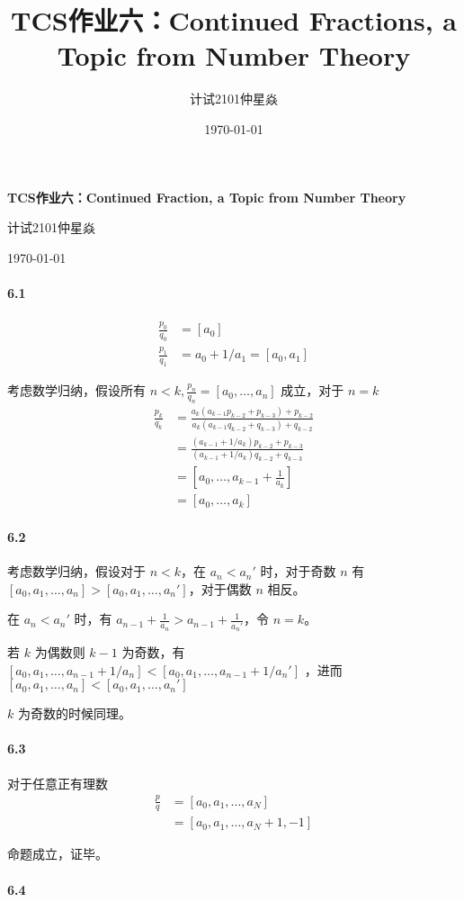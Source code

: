 \documentclass[12pt, a4paper, oneside]{ctexart}
\title{\textbf{TCS作业六：Continued Fractions, a Topic from Number Theory}}
\author{计试2101仲星焱}
\date{\today}
\begin{document}
	\textbf{TCS作业六：Continued Fraction, a Topic from Number Theory}
	
	计试2101仲星焱
	
	\today
	
	\paragraph{6.1}
	$$
	\begin{aligned}
		\frac{p_0}{q_0}&=[a_0]\\
		\frac{p_1}{q_1}&=a_0+1/a_1=[a_0,a_1]
	\end{aligned}
	$$
	
	考虑数学归纳，假设所有 $n<k,\frac{p_n}{q_n}=[a_0,\dots,a_n]$ 成立，对于 $n=k$ $$
	\begin{aligned}
		\frac{p_k}{q_k}&=\frac{a_{k}(a_{k-1}p_{k-2}+p_{k-3})+p_{k-2}}{a_{k}(a_{k-1}q_{k-2}+q_{k-3})+q_{k-2}}\\&=\frac{(a_{k-1}+1/a_k)p_{k-2}+p_{k-3}}{(a_{k-1}+1/a_k)q_{k-2}+q_{k-3}}\\&=[a_0,\dots,a_{k-1}+\frac{1}{a_k}]\\&=[a_0,\dots,a_k]
	\end{aligned}
	$$
	
	\paragraph{6.2}
	考虑数学归纳，假设对于 $n<k$，在 $a_n<a_n'$ 时，对于奇数 $n$ 有 $[a_0,a_1,\dots,a_n]>[a_0,a_1,\dots,a_n']$，对于偶数 $n$ 相反。
	
	在 $a_n<a_n'$ 时，有 $a_{n-1}+\frac{1}{a_n}>a_{n-1}+\frac{1}{a_n'}$，令 $n=k$。
	
	若 $k$ 为偶数则 $k-1$ 为奇数，有 $[a_0,a_1,\dots, a_{n-1}+1/a_n]<[a_0,a_1,\dots, a_{n-1}+1/a_n']$ ，进而$[a_0,a_1,\dots,a_n]<[a_0,a_1,\dots,a_n']$
	
	 $k$ 为奇数的时候同理。
	
	\paragraph{6.3}
	
	对于任意正有理数 $$
	\begin{aligned}
		\frac{p}q & =[a_0,a_1,\dots,a_N]\\
		&=[a_0,a_1,\dots, a_N+1,-1]
	\end{aligned}$$
	
	命题成立，证毕。
	
	\paragraph{6.4}
	
\end{document}
